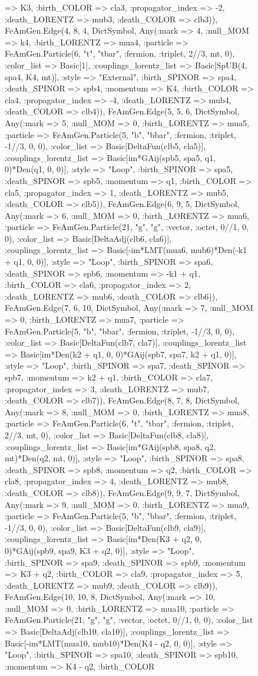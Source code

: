 \documentclass{revtex4}
\begin{document}
\begin{figure}[!htb]
\begin{center}
{=> K3, :birth_COLOR => cla3, :propagator_index => -2, :death_LORENTZ => mub3, :death_COLOR => clb3)), FeAmGen.Edge(4, 8, 4, Dict{Symbol, Any}(:mark => 4, :null_MOM => k4, :birth_LORENTZ => mua4, :particle => FeAmGen.Particle(6, "t", "tbar", :fermion, :triplet, 2//3, mt, 0), :color_list => Basic[1], :couplings_lorentz_list => Basic[SpUB(4, spa4, K4, mt)], :style => "External", :birth_SPINOR => spa4, :death_SPINOR => spb4, :momentum => K4, :birth_COLOR => cla4, :propagator_index => -4, :death_LORENTZ => mub4, :death_COLOR => clb4)), FeAmGen.Edge(5, 5, 6, Dict{Symbol, Any}(:mark => 5, :null_MOM => 0, :birth_LORENTZ => mua5, :particle => FeAmGen.Particle(5, "b", "bbar", :fermion, :triplet, -1//3, 0, 0), :color_list => Basic[DeltaFun(clb5, cla5)], :couplings_lorentz_list => Basic[im*GAij(spb5, spa5, q1, 0)*Den(q1, 0, 0)], :style => "Loop", :birth_SPINOR => spa5, :death_SPINOR => spb5, :momentum => q1, :birth_COLOR => cla5, :propagator_index => 1, :death_LORENTZ => mub5, :death_COLOR => clb5)), FeAmGen.Edge(6, 9, 5, Dict{Symbol, Any}(:mark => 6, :null_MOM => 0, :birth_LORENTZ => mua6, :particle => FeAmGen.Particle(21, "g", "g", :vector, :octet, 0//1, 0, 0), :color_list => Basic[DeltaAdj(clb6, cla6)], :couplings_lorentz_list => Basic[-im*LMT(mua6, mub6)*Den(-k1 + q1, 0, 0)], :style => "Loop", :birth_SPINOR => spa6, :death_SPINOR => spb6, :momentum => -k1 + q1, :birth_COLOR => cla6, :propagator_index => 2, :death_LORENTZ => mub6, :death_COLOR => clb6)), FeAmGen.Edge(7, 6, 10, Dict{Symbol, Any}(:mark => 7, :null_MOM => 0, :birth_LORENTZ => mua7, :particle => FeAmGen.Particle(5, "b", "bbar", :fermion, :triplet, -1//3, 0, 0), :color_list => Basic[DeltaFun(clb7, cla7)], :couplings_lorentz_list => Basic[im*Den(k2 + q1, 0, 0)*GAij(spb7, spa7, k2 + q1, 0)], :style => "Loop", :birth_SPINOR => spa7, :death_SPINOR => spb7, :momentum => k2 + q1, :birth_COLOR => cla7, :propagator_index => 3, :death_LORENTZ => mub7, :death_COLOR => clb7)), FeAmGen.Edge(8, 7, 8, Dict{Symbol, Any}(:mark => 8, :null_MOM => 0, :birth_LORENTZ => mua8, :particle => FeAmGen.Particle(6, "t", "tbar", :fermion, :triplet, 2//3, mt, 0), :color_list => Basic[DeltaFun(clb8, cla8)], :couplings_lorentz_list => Basic[im*GAij(spb8, spa8, q2, mt)*Den(q2, mt, 0)], :style => "Loop", :birth_SPINOR => spa8, :death_SPINOR => spb8, :momentum => q2, :birth_COLOR => cla8, :propagator_index => 4, :death_LORENTZ => mub8, :death_COLOR => clb8)), FeAmGen.Edge(9, 9, 7, Dict{Symbol, Any}(:mark => 9, :null_MOM => 0, :birth_LORENTZ => mua9, :particle => FeAmGen.Particle(5, "b", "bbar", :fermion, :triplet, -1//3, 0, 0), :color_list => Basic[DeltaFun(clb9, cla9)], :couplings_lorentz_list => Basic[im*Den(K3 + q2, 0, 0)*GAij(spb9, spa9, K3 + q2, 0)], :style => "Loop", :birth_SPINOR => spa9, :death_SPINOR => spb9, :momentum => K3 + q2, :birth_COLOR => cla9, :propagator_index => 5, :death_LORENTZ => mub9, :death_COLOR => clb9)), FeAmGen.Edge(10, 10, 8, Dict{Symbol, Any}(:mark => 10, :null_MOM => 0, :birth_LORENTZ => mua10, :particle => FeAmGen.Particle(21, "g", "g", :vector, :octet, 0//1, 0, 0), :color_list => Basic[DeltaAdj(clb10, cla10)], :couplings_lorentz_list => Basic[-im*LMT(mua10, mub10)*Den(K4 - q2, 0, 0)], :style => "Loop", :birth_SPINOR => spa10, :death_SPINOR => spb10, :momentum => K4 - q2, :birth_COLOR }
\end{center}
\end{figure}
\end{document}
